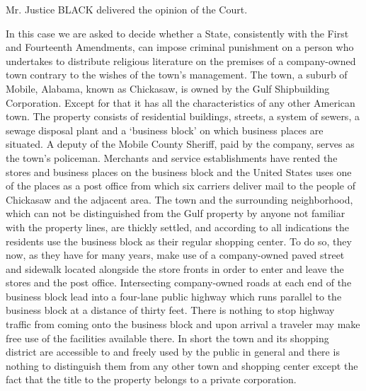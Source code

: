 
Mr. Justice BLACK delivered the opinion of the Court.

In this case we are asked to decide whether a State, consistently with the First
and Fourteenth Amendments, can impose criminal punishment on a person who
undertakes to distribute religious literature on the premises of a
company-owned town contrary to the wishes of the town's management. The town, a
suburb of Mobile, Alabama, known as Chickasaw, is owned by the Gulf
Shipbuilding Corporation. Except for that it has all the characteristics of any
other American town. The property consists of residential buildings, streets, a
system of sewers, a sewage disposal plant and a `business block' on which
business places are situated. A deputy of the Mobile County Sheriff, paid by
the company, serves as the town's policeman. Merchants and service
establishments have rented the stores and business places on the business block
and the United States uses one of the places as a post office from which six
carriers deliver mail to the people of Chickasaw and the adjacent area. The
town and the surrounding neighborhood, which can not be distinguished from the
Gulf property by anyone not familiar with the property lines, are thickly
settled, and according to all indications the residents use the business block
as their regular shopping center. To do so, they now, as they have for many
years, make use of a company-owned paved street and sidewalk located alongside
the store fronts in order to enter and leave the stores and the post office.
Intersecting company-owned roads at each end of the business block lead into a
four-lane public highway which runs parallel to the business block at a
distance of thirty feet. There is nothing to stop highway traffic from coming
onto the business block and upon arrival a traveler may make free use of the
facilities available there. In short the town and its shopping district are
accessible to and freely used by the public in general and there is nothing to
distinguish them from any other town and shopping center except the fact that
the title to the property belongs to a private corporation.

